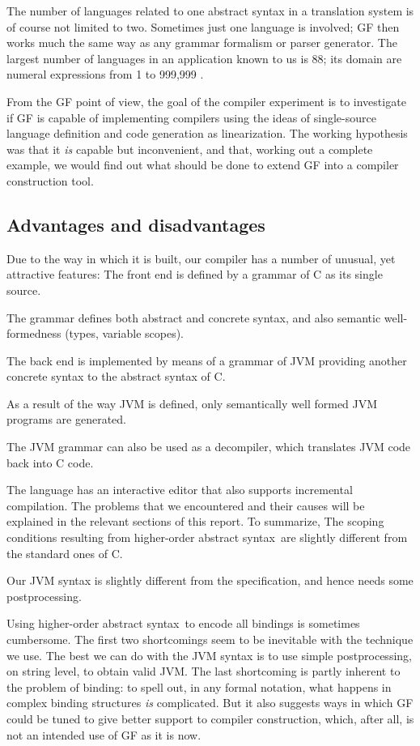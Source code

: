 \documentclass[12pt]{article}
\newcommand{\HOAS}{higher-order abstract syntax}
\begin{document}
The number of languages related to one abstract syntax in
a translation system is of course not limited to two. 
Sometimes just one language is involved; 
GF then works much the same way as any grammar 
formalism or parser generator. 
The largest number of languages in an application known to us is 88;
its domain are numeral expressions from 1 to 999,999 \cite{gf-homepage}.
 
From the GF point of view, the goal of the compiler experiment
is to investigate if GF is capable of implementing
compilers using the ideas of single-source language definition
and code generation as linearization. The working hypothesis
was that it \textit{is} capable but inconvenient, and that,
working out a complete example, we would find out what 
should be done to extend GF into a compiler construction tool.


\subsection{Advantages and disadvantages}

Due to the way in which it is built, our compiler has
a number of unusual, yet attractive features:
\bequ
The front end is defined by a grammar of C as its single source.

The grammar defines both abstract and concrete syntax, and also
semantic well-formedness (types, variable scopes).

The back end is implemented by means of a grammar of JVM providing
another concrete syntax to the abstract syntax of C.

As a result of the way JVM is defined, only semantically well formed
JVM programs are generated.

The JVM grammar can also be used as a decompiler, which translates
JVM code back into C code.

The language has an interactive editor that also supports incremental
compilation.
\enqu
The problems that we encountered and their causes will be explained in 
the relevant sections of this report. To summarize,
\bequ
The scoping conditions resulting from \HOAS\ are slightly different
from the standard ones of C.

Our JVM syntax is slightly different from the specification, and
hence needs some postprocessing.

Using \HOAS\ to encode all bindings is sometimes cumbersome.
\enqu
The first two shortcomings seem to be inevitable with the technique
we use. The best we can do with the JVM syntax is to use simple
postprocessing, on string level, to obtain valid JVM. The last 
shortcoming is partly inherent to the problem of binding:
to spell out, in any formal notation,
what happens in complex binding structures \textit{is}
complicated. But it also suggests ways in which GF could be 
tuned to give better support
to compiler construction, which, after all, is not an intended
use of GF as it is now.
\end{document}
